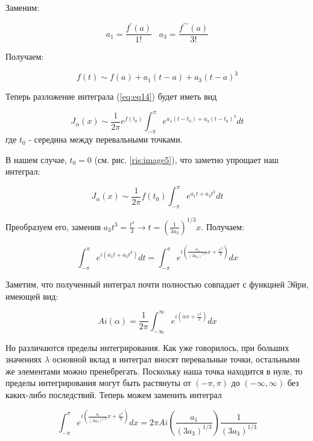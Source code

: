 \documentclass[14pt]{extarticle}
\begin{document}
Заменим:

$$
a_1 = \frac{f^{\prime}(a)}{1!} \;\;\; a_3 = \frac{f^{\prime\prime\prime}(a)}{3!}
$$

Получаем:
  
\begin{equation}\label{eq:eq18}
f(t) \sim f(a) + a_1(t-a) + a_3(t-a)^3
\end{equation}
  
Теперь разложение интеграла (\ref{eq:eq14}) будет иметь вид

\begin{equation}\nonumber
J_\alpha(x) \sim \frac{1}{2\pi} e^{f(t_0)} \int_{-\pi}^{\pi}e^{a_1(t-t_0) + a_3(t-t_0)^3}dt
\end{equation}
где $t_0$ - середина между перевальными точками.

В нашем случае, $t_0=0$ (см. рис. \ref{ris:image5}), что заметно упрощает наш интеграл:

\begin{equation}\nonumber
J_\alpha(x) \sim \frac{1}{2\pi} f(t_0) \int_{-\pi}^{\pi}e^{a_1 t + a_3 t^3}dt
\end{equation}
  
Преобразуем его, заменив $a_3t^3 = \frac{t^3}{3} \rightarrow t = \left(\frac{1}{3a_3}\right)^{1/3}x$. Получаем:

\begin{equation}\nonumber
\int_{-\pi}^{\pi}e^{i\left(a_1 t + a_3 t^3\right)}dt = \int_{-\pi}^{\pi}e^{i\left(\frac{a_1}{(3a_3)^{1/3}}x + \frac{x^3}{3}\right)}dx 
\end{equation}

Заметим, что полученный интеграл почти полностью совпадает с функцией Эйри, имеющей вид:

\begin{equation}\nonumber
Ai(\alpha) = \frac{1}{2\pi}\int_{-\infty}^{\infty}e^{i\left(\alpha x + \frac{x^3}{3}\right)}dx 
\end{equation}

Но различаются пределы интегрирования. Как уже говорилось, при больших значениях $\lambda$ основной вклад в интеграл вносят перевальные точки, остальными же элементами можно пренебрегать. Поскольку наша точка находится в нуле, то пределы интегрирования могут быть растянуты от $(-\pi, \pi)$ до $(-\infty, \infty)$ без каких-либо последствий. Теперь можем заменить интеграл 
  
\begin{equation}\nonumber
	\int_{-\pi}^{\pi}e^{i\left(\frac{a_1}{(3a_3)^{1/3}}x + \frac{x^3}{3}\right)}dx = 2\pi Ai\left(\frac{a_1}{(3 a_3)^{1/3}}\right) \frac{1}{(3 a_3)^{1/3}}
\end{equation}
\end{document}
